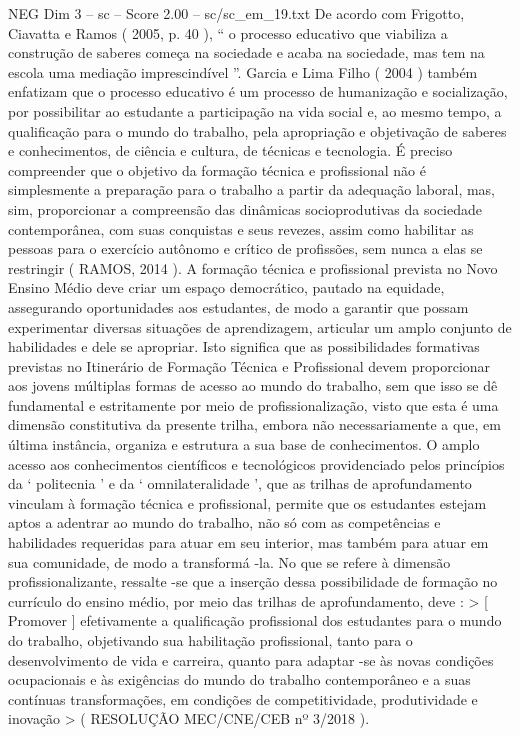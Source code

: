 \begin{textsample}{NEG Dim 3 – sc – Score 2.00 – sc/sc\_em\_19.txt}
De acordo com Frigotto, Ciavatta e Ramos ( 2005, p. 40 ), “ o processo educativo que viabiliza a construção de saberes começa na sociedade e acaba na sociedade, mas tem na escola uma mediação imprescindível ”.
Garcia e Lima Filho ( 2004 ) também enfatizam que o processo educativo é um processo de humanização e socialização, por possibilitar ao estudante a participação na vida social e, ao mesmo tempo, a qualificação para o mundo do trabalho, pela apropriação e objetivação de saberes e conhecimentos, de ciência e cultura, de técnicas e tecnologia.
É preciso compreender que o objetivo da formação técnica e profissional não é simplesmente a preparação para o trabalho a partir da adequação laboral, mas, sim, proporcionar a compreensão das dinâmicas socioprodutivas da sociedade contemporânea, com suas conquistas e seus revezes, assim como habilitar as pessoas para o exercício autônomo e crítico de profissões, sem nunca a elas se restringir ( RAMOS, 2014 ).
A formação técnica e profissional prevista no Novo Ensino Médio deve criar um espaço democrático, pautado na equidade, assegurando oportunidades aos estudantes, de modo a garantir que possam experimentar diversas situações de aprendizagem, articular um amplo conjunto de habilidades e dele se apropriar.
Isto significa que as possibilidades formativas previstas no Itinerário de Formação Técnica e Profissional devem proporcionar aos jovens múltiplas formas de acesso ao mundo do trabalho, sem que isso se dê fundamental e estritamente por meio de profissionalização, visto que esta é uma dimensão constitutiva da presente trilha, embora não necessariamente a que, em última instância, organiza e estrutura a sua base de conhecimentos.
O amplo acesso aos conhecimentos científicos e tecnológicos providenciado pelos princípios da ‘ politecnia ’ e da ‘ omnilateralidade ’, que as trilhas de aprofundamento vinculam à formação técnica e profissional, permite que os estudantes estejam aptos a adentrar ao mundo do trabalho, não só com as competências e habilidades requeridas para atuar em seu interior, mas também para atuar em sua comunidade, de modo a transformá -la.
No que se refere à dimensão profissionalizante, ressalte -se que a inserção dessa possibilidade de formação no currículo do ensino médio, por meio das trilhas de aprofundamento, deve : > [ Promover ] efetivamente a qualificação profissional dos estudantes para o mundo do trabalho, objetivando sua habilitação profissional, tanto para o desenvolvimento de vida e carreira, quanto para adaptar -se às novas condições ocupacionais e às exigências do mundo do trabalho contemporâneo e a suas contínuas transformações, em condições de competitividade, produtividade e inovação > ( RESOLUÇÃO MEC/CNE/CEB nº 3/2018 ).

\end{textsample}
